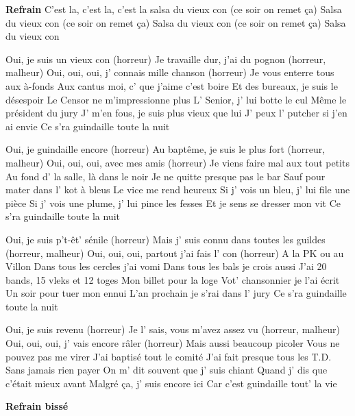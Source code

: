 \footnotemark [
ititle={Salsa des vieux cons, la},
tu={La Salsa du Démon (Le Grand Orchestre du Splendid)}]


\beginchorus
\textbf{Refrain}
C'est la, c'est la, c'est la salsa du vieux con (ce soir on remet ça)
Salsa du vieux con (ce soir on remet ça)
Salsa du vieux con (ce soir on remet ça)
Salsa du vieux con
\endchorus

\beginverse
Oui, je suis un vieux con (horreur)
Je travaille dur, j'ai du pognon (horreur, malheur)
Oui, oui, oui, j' connais mille chanson (horreur)
Je vous enterre tous aux à-fonds
Aux cantus moi, c' que j'aime c'est boire
Et des bureaux, je suis le désespoir
Le Censor ne m'impressionne plus
L' Senior, j' lui botte le cul
Même le président du jury
J' m'en fous, je suis plus vieux que lui
J' peux l' putcher si j'en ai envie
Ce s'ra guindaille toute la nuit
\endverse

\beginverse
Oui, je guindaille encore (horreur)
Au baptême, je suis le plus fort (horreur, malheur)
Oui, oui, oui, avec mes amis (horreur)
Je viens faire mal aux tout petits
Au fond d’ la salle, là dans le noir
Je ne quitte presque pas le bar
Sauf pour mater dans l’ kot à bleus
Le vice me rend heureux
Si j’ vois un bleu, j’ lui file une pièce
Si j’ vois une plume, j’ lui pince les fesses
Et je sens se dresser mon vit
Ce s’ra guindaille toute la nuit
\endverse

\beginverse
Oui, je suis p’t-êt’ sénile (horreur)
Mais j’ suis connu dans toutes les guildes (horreur, malheur)
Oui, oui, oui, partout j’ai fais l’ con (horreur)
A la PK ou au Villon
Dans tous les cercles j’ai vomi
Dans tous les bals je crois aussi
J’ai 20 bands, 15 vleks et 12 toges
Mon billet pour la loge
Vot’ chansonnier je l’ai écrit
Un soir pour tuer mon ennui
L’an prochain je s’rai dans l’ jury
Ce s’ra guindaille toute la nuit
\endverse

\beginverse
Oui, je suis revenu (horreur)
Je l’ sais, vous m’avez assez vu (horreur, malheur)
Oui, oui, oui, j’ vais encore râler (horreur)
Mais aussi beaucoup picoler
Vous ne pouvez pas me virer
J’ai baptisé tout le comité
J’ai fait presque tous les T.D.
Sans jamais rien payer
On m’ dit souvent que j’ suis chiant
Quand j’ dis que c’était mieux avant
Malgré ça, j’ suis encore ici
Car c’est guindaille tout’ la vie
\endverse

\beginchorus
\textbf{Refrain bissé}
\endchorus
\endsong